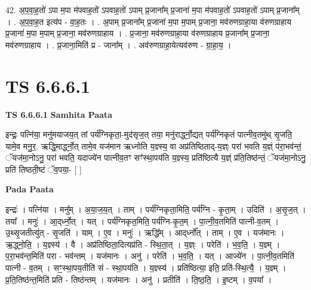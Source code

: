 \documentclass[17pt]{extarticle}
\begin{document}
42. अ॒प॒वा॒ह॒तो॑ ऽपा म॒पा म॑पवाह॒तो॑ ऽपवाह॒तो॑ ऽपाम् प्र॒जाना᳚म् प्र॒जाना॑ म॒पा म॑पवाह॒तो॑ ऽपवाह॒तो॑ ऽपाम् प्र॒जाना᳚म् । . अ॒प॒वा॒ह॒त इत्य॑प - वा॒ह॒तः । . अ॒पाम् प्र॒जाना᳚म् प्र॒जाना॑ म॒पा म॒पाम् प्र॒जाना॒ मव॑रुणग्राहा॒या व॑रुणग्राहाय प्र॒जाना॑ म॒पा म॒पाम् प्र॒जाना॒ मव॑रुणग्राहाय । . प्र॒जाना॒ मव॑रुणग्राहा॒या व॑रुणग्राहाय प्र॒जाना᳚म् प्र॒जाना॒ मव॑रुणग्राहाय । . प्र॒जाना॒मिति॑ प्र - जाना᳚म् । . अव॑रुणग्राहा॒येत्यव॑रुण - ग्रा॒हा॒य॒ । \newline
\pagebreak
{}

\section{ TS 6.6.6.1 }

\textbf{TS 6.6.6.1 } \newline
\textbf{Samhita Paata} \newline

इन्द्रः॒ पत्नि॑या॒ मनु॑मयाजय॒त् तां पर्य॑ग्निकृता॒-मुद॑सृज॒त् तया॒ मनु॑रार्द्ध्नो॒द्यत् पर्य॑ग्निकृतं पात्नीव॒तमु॑थ् सृ॒जति॒ यामे॒व मनु॒र॒. ऋद्धि॒मार्द्ध्नो॒त् तामे॒व यज॑मान ऋध्नोति य॒ज्ञ्स्य॒ वा अप्र॑तिष्ठिताद्-य॒ज्ञ्ः परा॑ भवति य॒ज्ञ्ं प॑रा॒भव॑न्तं॒ ॅयज॑मा॒नोऽनु॒ परा॑ भवति॒ यदाज्ये॑न पात्नीव॒तꣳ सꣳ॑स्था॒पय॑ति य॒ज्ञ्स्य॒ प्रति॑ष्ठित्यै य॒ज्ञ्ं प्र॑ति॒तिष्ठ॑न्तं॒ ॅयज॑मा॒नोऽनु॒ प्रति॑ तिष्ठती॒ष्टं ॅव॒पया॒- [  ] \newline

\textbf{Pada Paata} \newline

इन्द्रः॑ । पत्नि॑या । मनु᳚म् । अ॒या॒ज॒य॒त् । ताम् । पर्य॑ग्निकृता॒मिति॒ पर्य॑ग्नि - कृ॒ता॒म् । उदिति॑ । अ॒सृ॒ज॒त् । तया᳚ । मनुः॑ । आ॒द्‌र्ध्नो॒त् । यत् । पर्य॑ग्निकृत॒मिति॒ पर्य॑ग्नि-कृ॒त॒म् । पा॒त्नी॒व॒तमिति॑ पात्नी-व॒तम् । उ॒थ्सृ॒जतीत्यु॑त् - सृ॒जति॑ । याम् । ए॒व । मनुः॑ । ऋद्धि᳚म् । आद्‌र्ध्नो᳚त् । ताम् । ए॒व । यज॑मानः । ऋ॒द्ध्नो॒ति॒ । य॒ज्ञ्स्य॑ । वै । अप्र॑तिष्ठिता॒दित्यप्र॑ति - स्थि॒ता॒त् । य॒ज्ञ्ः । परेति॑ । भ॒व॒ति॒ । य॒ज्ञ्म् । प॒रा॒भव॑न्त॒मिति॑ परा - भव॑न्तम् । यज॑मानः । अनु॑ । परेति॑ । भ॒व॒ति॒ । यत् । आज्ये॑न । पा॒त्नी॒व॒तमिति॑ पात्नी - व॒तम् । सꣳ॒॒स्था॒पय॒तीति॑ सं - स्था॒पय॑ति । य॒ज्ञ्स्य॑ । प्रति॑ष्ठित्या॒ इति॒ प्रति॑-स्थि॒त्यै॒ । य॒ज्ञ्म् । प्र॒ति॒तिष्ठ॑न्त॒मिति॑ प्रति - तिष्ठ॑न्तम् । यज॑मानः । अनु॑ । प्रतीति॑ । ति॒ष्ठ॒ति॒ । इ॒ष्टम् । व॒पया᳚ ।  \newline
\end{document}
